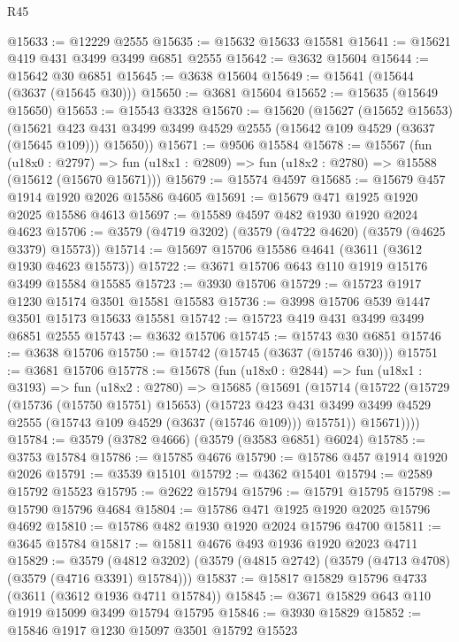 \begin{lexlean}{R45}
\begin{coremodule}
@15633 := @12229 @2555
@15635 := @15632 @15633 @15581
@15641 := @15621 @419 @431 @3499 @3499 @6851 @2555
@15642 := @3632 @15604
@15644 := @15642 @30 @6851
@15645 := @3638 @15604
@15649 := @15641 (@15644 (@3637 (@15645 @30)))
@15650 := @3681 @15604
@15652 := @15635 (@15649 @15650)
@15653 := @15543 @3328
@15670 := @15620
    (@15627
      (@15652 @15653)
      (@15621 @423 @431 @3499 @3499 @4529 @2555 (@15642 @109 @4529 (@3637 (@15645 @109))) @15650))
@15671 := @9506 @15584
@15678 := @15567
    (fun (u18x0 : @2797) =>
    fun (u18x1 : @2809) => fun (u18x2 : @2780) => @15588 (@15612 (@15670 @15671)))
@15679 := @15574 @4597
@15685 := @15679 @457 @1914 @1920 @2026 @15586 @4605
@15691 := @15679 @471 @1925 @1920 @2025 @15586 @4613
@15697 := @15589 @4597 @482 @1930 @1920 @2024 @4623
@15706 := @3579 (@4719 @3202) (@3579 (@4722 @4620) (@3579 (@4625 @3379) @15573))
@15714 := @15697 @15706 @15586 @4641 (@3611 (@3612 @1930 @4623 @15573))
@15722 := @3671 @15706 @643 @110 @1919 @15176 @3499 @15584 @15585
@15723 := @3930 @15706
@15729 := @15723 @1917 @1230 @15174 @3501 @15581 @15583
@15736 := @3998 @15706 @539 @1447 @3501 @15173 @15633 @15581
@15742 := @15723 @419 @431 @3499 @3499 @6851 @2555
@15743 := @3632 @15706
@15745 := @15743 @30 @6851
@15746 := @3638 @15706
@15750 := @15742 (@15745 (@3637 (@15746 @30)))
@15751 := @3681 @15706
@15778 := @15678
    (fun (u18x0 : @2844) =>
    fun (u18x1 : @3193) =>
    fun (u18x2 : @2780) =>
    @15685
      (@15691
        (@15714
          (@15722
            (@15729
              (@15736 (@15750 @15751) @15653)
              (@15723
                @423
                @431
                @3499
                @3499
                @4529
                @2555
                (@15743 @109 @4529 (@3637 (@15746 @109)))
                @15751))
            @15671))))
@15784 := @3579 (@3782 @4666) (@3579 (@3583 @6851) @6024)
@15785 := @3753 @15784
@15786 := @15785 @4676
@15790 := @15786 @457 @1914 @1920 @2026
@15791 := @3539 @15101
@15792 := @4362 @15401
@15794 := @2589 @15792 @15523
@15795 := @2622 @15794
@15796 := @15791 @15795
@15798 := @15790 @15796 @4684
@15804 := @15786 @471 @1925 @1920 @2025 @15796 @4692
@15810 := @15786 @482 @1930 @1920 @2024 @15796 @4700
@15811 := @3645 @15784
@15817 := @15811 @4676 @493 @1936 @1920 @2023 @4711
@15829 := @3579
    (@4812 @3202)
    (@3579 (@4815 @2742) (@3579 (@4713 @4708) (@3579 (@4716 @3391) @15784)))
@15837 := @15817 @15829 @15796 @4733 (@3611 (@3612 @1936 @4711 @15784))
@15845 := @3671 @15829 @643 @110 @1919 @15099 @3499 @15794 @15795
@15846 := @3930 @15829
@15852 := @15846 @1917 @1230 @15097 @3501 @15792 @15523

\end{coremodule}
\end{lexlean}
